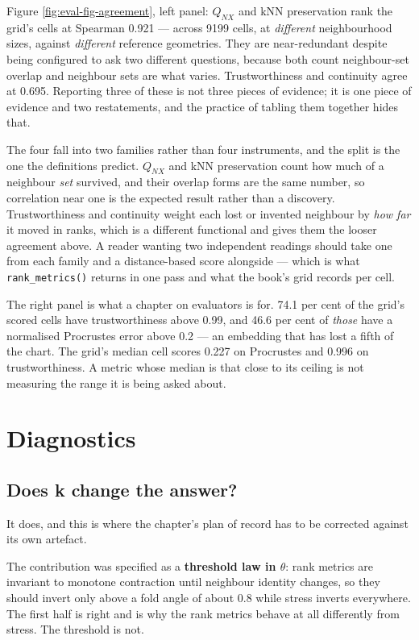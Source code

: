 \documentclass[
  british,
  a4paper,
]{book}
\begin{document}
Figure \ref{fig:eval-fig-agreement}, left panel: \(Q_{NX}\) and kNN preservation
rank the grid's cells at Spearman 0.921 --- across
9199 cells, at \emph{different} neighbourhood sizes,
against \emph{different} reference geometries. They are near-redundant despite being
configured to ask two different questions, because both count neighbour-set
overlap and neighbour sets are what varies. Trustworthiness and continuity agree
at 0.695. Reporting three of these is not three pieces of
evidence; it is one piece of evidence and two restatements, and the practice of
tabling them together \citep{espadoto2021survey} hides that.

The four fall into two families rather than four instruments, and the split is
the one the definitions predict. \(Q_{NX}\) and kNN preservation count how much of
a neighbour \emph{set} survived, and their overlap forms are the same number, so
correlation near one is the expected result rather than a discovery.
Trustworthiness and continuity weight each lost or invented neighbour by \emph{how
far} it moved in ranks, which is a different functional and gives them the
looser agreement above. A reader wanting two independent readings should take
one from each family and a distance-based score alongside --- which is what
\texttt{rank\_metrics()} returns in one pass and what the book's grid records per cell.

The right panel is what a chapter on evaluators is for.
74.1 per cent of the grid's scored cells have
trustworthiness above 0.99, and 46.6 per cent of
\emph{those} have a normalised Procrustes error above 0.2 --- an embedding that has
lost a fifth of the chart. The grid's median cell scores
0.227 on Procrustes and
0.996 on trustworthiness. A metric whose median is
that close to its ceiling is not measuring the range it is being asked about.

\section{Diagnostics}\label{eval-diagnostics}

\subsection{Does k change the answer?}\label{does-k-change-the-answer}

It does, and this is where the chapter's plan of record has to be corrected
against its own artefact.

The contribution was specified as a \textbf{threshold law in \(\theta\)}: rank metrics
are invariant to monotone contraction until neighbour identity changes, so they
should invert only above a fold angle of about 0.8 while stress inverts
everywhere. The first half is right and is why the rank metrics behave at all
differently from stress. The threshold is not.
\end{document}
